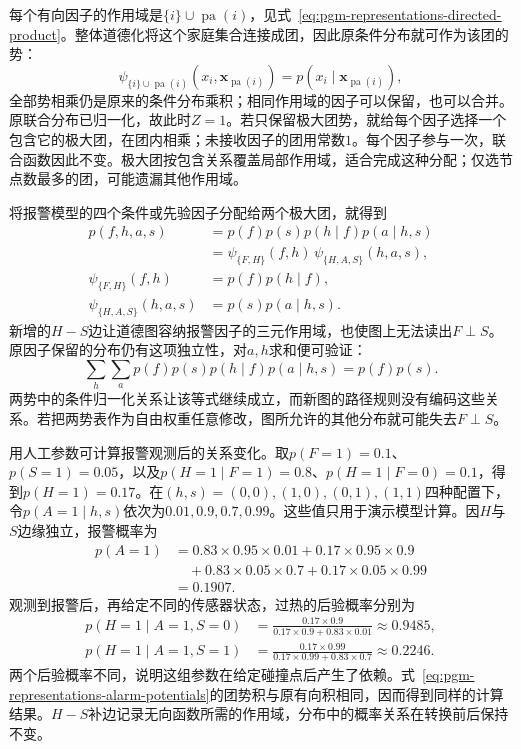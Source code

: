 每个有向因子的作用域是$\{i\}\cup\operatorname{pa}(i)$，见式~\eqref{eq:pgm-representations-directed-product}。整体道德化将这个家庭集合连接成团，因此原条件分布就可作为该团的势：
\[
  \psi_{\{i\}\cup\operatorname{pa}(i)}
  (x_i,\bm{x}_{\operatorname{pa}(i)})
  =
  p(x_i\mid\bm{x}_{\operatorname{pa}(i)}),
\]
全部势相乘仍是原来的条件分布乘积；相同作用域的因子可以保留，也可以合并。原联合分布已归一化，故此时$Z=1$。若只保留极大团势，就给每个因子选择一个包含它的极大团，在团内相乘；未接收因子的团用常数$1$。每个因子参与一次，联合函数因此不变。极大团按包含关系覆盖局部作用域，适合完成这种分配；仅选节点数最多的团，可能遗漏其他作用域。

将报警模型的四个条件或先验因子分配给两个极大团，就得到
\begin{equation}
  \begin{aligned}
    p(f,h,a,s)&=p(f)p(s)p(h\mid f)p(a\mid h,s)\\
    &=\psi_{\{F,H\}}(f,h)\,
      \psi_{\{H,A,S\}}(h,a,s),\\
    \psi_{\{F,H\}}(f,h)&=p(f)p(h\mid f),\\
    \psi_{\{H,A,S\}}(h,a,s)&=p(s)p(a\mid h,s).
  \end{aligned}
  \label{eq:pgm-representations-alarm-potentials}
\end{equation}
新增的$H-S$边让道德图容纳报警因子的三元作用域，也使图上无法读出$F\perp S$。原因子保留的分布仍有这项独立性，对$a,h$求和便可验证：
\[
  \sum_h\sum_a p(f)p(s)p(h\mid f)p(a\mid h,s)
  =p(f)p(s).
\]
两势中的条件归一化关系让该等式继续成立，而新图的路径规则没有编码这些关系。若把两势表作为自由权重任意修改，图所允许的其他分布就可能失去$F\perp S$。

用人工参数可计算报警观测后的关系变化。取$p(F=1)=0.1$、$p(S=1)=0.05$，以及$p(H=1\mid F=1)=0.8$、$p(H=1\mid F=0)=0.1$，得到$p(H=1)=0.17$。在$(h,s)=(0,0),(1,0),(0,1),(1,1)$四种配置下，令$p(A=1\mid h,s)$依次为$0.01,0.9,0.7,0.99$。这些值只用于演示模型计算。因$H$与$S$边缘独立，报警概率为
\[
  \begin{aligned}
    p(A=1)
    &=0.83\times0.95\times0.01
      +0.17\times0.95\times0.9\\
    &\quad+0.83\times0.05\times0.7
      +0.17\times0.05\times0.99\\
    &=0.1907.
  \end{aligned}
\]
观测到报警后，再给定不同的传感器状态，过热的后验概率分别为
\begin{equation}
  \begin{aligned}
    p(H=1\mid A=1,S=0)
    &=\frac{0.17\times0.9}
    {0.17\times0.9+0.83\times0.01}
    \approx0.9485,\\
    p(H=1\mid A=1,S=1)
    &=\frac{0.17\times0.99}
    {0.17\times0.99+0.83\times0.7}
    \approx0.2246.
  \end{aligned}
  \label{eq:pgm-representations-alarm-posteriors}
\end{equation}
两个后验概率不同，说明这组参数在给定碰撞点后产生了依赖。式~\eqref{eq:pgm-representations-alarm-potentials}的团势积与原有向积相同，因而得到同样的计算结果。$H-S$补边记录无向函数所需的作用域，分布中的概率关系在转换前后保持不变。


